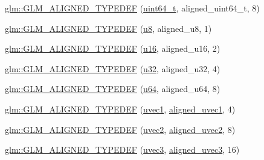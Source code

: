 \begin{DoxyCompactItemize}
\item 
\hyperlink{group__gtx__type__aligned_ga68c0b9e669060d0eb5ab8c3ddeb483d8}{glm\+::\+G\+L\+M\+\_\+\+A\+L\+I\+G\+N\+E\+D\+\_\+\+T\+Y\+P\+E\+D\+EF} (\hyperlink{group__gtc__type__precision_ga058f57c19e1befdcf12498944bd73e69}{uint64\+\_\+t}, aligned\+\_\+uint64\+\_\+t, 8)
\item 
\hyperlink{group__gtx__type__aligned_ga4f3bab577daf3343e99cc005134bce86}{glm\+::\+G\+L\+M\+\_\+\+A\+L\+I\+G\+N\+E\+D\+\_\+\+T\+Y\+P\+E\+D\+EF} (\hyperlink{group__gtc__type__precision_ga5e3dc67373d5068997d2d9f41c9024d2}{u8}, aligned\+\_\+u8, 1)
\item 
\hyperlink{group__gtx__type__aligned_ga13a2391339d0790d43b76d00a7611c4f}{glm\+::\+G\+L\+M\+\_\+\+A\+L\+I\+G\+N\+E\+D\+\_\+\+T\+Y\+P\+E\+D\+EF} (\hyperlink{group__gtc__type__precision_gae7a1571503f83d2264ddfa705a6b082a}{u16}, aligned\+\_\+u16, 2)
\item 
\hyperlink{group__gtx__type__aligned_ga197570e03acbc3d18ab698e342971e8f}{glm\+::\+G\+L\+M\+\_\+\+A\+L\+I\+G\+N\+E\+D\+\_\+\+T\+Y\+P\+E\+D\+EF} (\hyperlink{group__gtc__type__precision_ga54e837745059fd29017bed71cfa0a8db}{u32}, aligned\+\_\+u32, 4)
\item 
\hyperlink{group__gtx__type__aligned_ga0f033b21e145a1faa32c62ede5878993}{glm\+::\+G\+L\+M\+\_\+\+A\+L\+I\+G\+N\+E\+D\+\_\+\+T\+Y\+P\+E\+D\+EF} (\hyperlink{group__gtc__type__precision_ga71cedd4972f9cb1a5e14dfe5ab83ecd7}{u64}, aligned\+\_\+u64, 8)
\item 
\hyperlink{group__gtx__type__aligned_ga509af83527f5cd512e9a7873590663aa}{glm\+::\+G\+L\+M\+\_\+\+A\+L\+I\+G\+N\+E\+D\+\_\+\+T\+Y\+P\+E\+D\+EF} (\hyperlink{gtc_2vec1_8hpp_a4e12bc23a3d060164eef452f81d92a03}{uvec1}, \hyperlink{group__gtc__type__aligned_gab0fbe9830a7129d9135b558b30eed930}{aligned\+\_\+uvec1}, 4)
\item 
\hyperlink{group__gtx__type__aligned_ga94e86186978c502c6dc0c0d9c4a30679}{glm\+::\+G\+L\+M\+\_\+\+A\+L\+I\+G\+N\+E\+D\+\_\+\+T\+Y\+P\+E\+D\+EF} (\hyperlink{group__core__types_gafd2041b45eff671aa8899d2c2835eee9}{uvec2}, \hyperlink{group__gtc__type__aligned_gacddd39189c2dedf7dd48c02155279124}{aligned\+\_\+uvec2}, 8)
\item 
\hyperlink{group__gtx__type__aligned_ga5cec574686a7f3c8ed24bb195c5e2d0a}{glm\+::\+G\+L\+M\+\_\+\+A\+L\+I\+G\+N\+E\+D\+\_\+\+T\+Y\+P\+E\+D\+EF} (\hyperlink{group__core__types_gac4ba593917841b859ba1683b8b52b8fa}{uvec3}, \hyperlink{group__gtc__type__aligned_ga5dee635ca69be0f5de5630a59d89034f}{aligned\+\_\+uvec3}, 16)
\item 

\end{DoxyCompactItemize}

